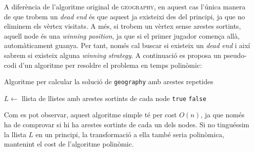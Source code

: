 \documentclass[a4paper]{article}
\begin{document}
A diferència de l’algoritme original de \textsc{geography}, en aquest cas l'única manera de que trobem un \emph{dead end} és que aquest ja existeixi des del principi, ja que no eliminem els vèrtex visitats. A més, si  trobem un vèrtex sense arestes sortints, aquell node és una \emph{winning position}, ja que si el primer jugador comença allà, automàticament guanya. Per tant, només cal buscar si existeix un \emph{dead end} i així sabrem si existeix alguna \emph{winning strategy}. A continuació es proposa un pseudo-codi d'un algoritme per resoldre el problema en temps polinòmic:

\begin{algorithm}
	\caption{Algoritme per calcular la solució de \texttt{geography} amb arestes repetides}
	\begin{algorithmic}[1]
		\State $L \gets $ llista de llistes amb arestes sortints de cada node
				\State \Return \texttt{true}
			\EndIf
		\EndFor
		\State \Return \texttt{false}
	\end{algorithmic}
\end{algorithm}
Com es pot observar, aquest algoritme simple té per cost $O(n)$, ja que només ha de comprovar si hi ha arestes sortints de cada un dels nodes. Si no tinguéssim la llista $L$ en un principi, la transformació a ella també seria polinòmica, mantenint el cost de l’algoritme polinòmic.
\end{document}
